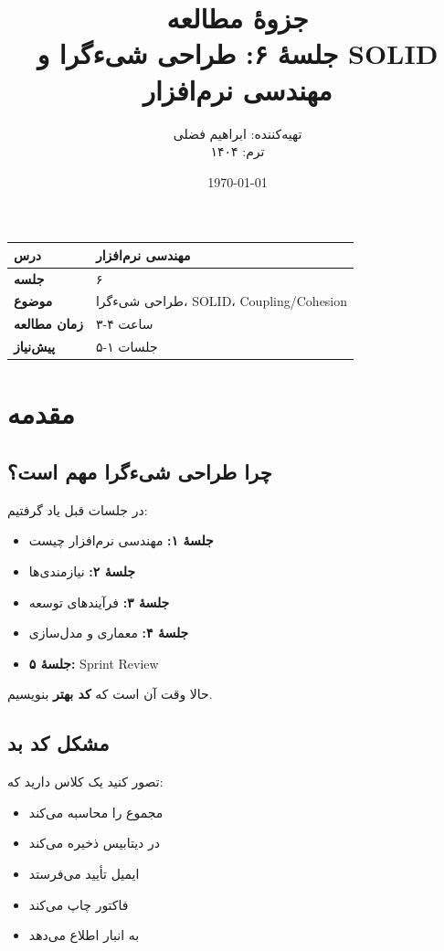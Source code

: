 \documentclass[12pt, a4paper]{article}
\title{
    \vspace{-1cm}
    \textbf{\Huge جزوهٔ مطالعه}\\[0.3cm]
    \textbf{\LARGE جلسهٔ ۶: طراحی شیءگرا و SOLID}\\[0.5cm]
    \large مهندسی نرم‌افزار
}
\author{
    تهیه‌کننده: ابراهیم فضلی\\
    ترم: ۱۴۰۴
}
\date{\today}
\begin{document}
\maketitle
\thispagestyle{empty}

\vspace{1cm}

\begin{center}
\begin{tabular}{|l|l|}
\hline
\textbf{درس} & مهندسی نرم‌افزار \\
\hline
\textbf{جلسه} & ۶ \\
\hline
\textbf{موضوع} & طراحی شیءگرا، SOLID، Coupling/Cohesion \\
\hline
\textbf{زمان مطالعه} & ۳-۴ ساعت \\
\hline
\textbf{پیش‌نیاز} & جلسات ۱-۵ \\
\hline
\end{tabular}
\end{center}

\newpage
\tableofcontents
\newpage

\section{مقدمه}

\subsection{چرا طراحی شیءگرا مهم است؟}

در جلسات قبل یاد گرفتیم:
\begin{itemize}
    \item \textbf{جلسهٔ ۱:} مهندسی نرم‌افزار چیست
    \item \textbf{جلسهٔ ۲:} نیازمندی‌ها
    \item \textbf{جلسهٔ ۳:} فرآیندهای توسعه
    \item \textbf{جلسهٔ ۴:} معماری و مدل‌سازی
    \item \textbf{جلسهٔ ۵:} Sprint Review
\end{itemize}

حالا وقت آن است که \textbf{کد بهتر} بنویسیم.

\subsection{مشکل کد بد}

تصور کنید یک کلاس  دارید که:
\begin{itemize}
    \item مجموع را محاسبه می‌کند
    \item در دیتابیس ذخیره می‌کند
    \item ایمیل تأیید می‌فرستد
    \item فاکتور چاپ می‌کند
    \item به انبار اطلاع می‌دهد
\end{itemize}
\end{document}
